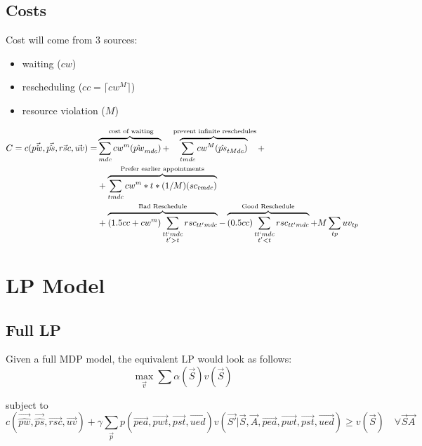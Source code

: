 \documentclass{article}
\begin{document}
\subsection{Costs}
Cost will come from 3 sources:  
\begin{itemize} 
	\item waiting ($cw$)
	\item rescheduling ($cc = \lceil cw^M \rceil$)
	\item resource violation ($M$)
\end{itemize}

\begin{equation}\begin{alignedat}{10}
	& C = c(\vec{\hat{pw}}, \vec{\hat{ps}}, \vec{rsc}, \vec{uv}) = 
		&& 
			\overbrace{ \sum_{mdc} cw^{m} (\hat{pw}_{mdc}) }^\text{
				cost of waiting}  + 
			\overbrace{ \sum_{tmdc} cw^{M} (\hat{ps}_{tMdc})}^\text{
				prevent infinite reschedules} + \\
	&	&&	+
				\overbrace{
					\sum_{tmdc} cw^{m} * t * (1/M)  (sc_{tmdc})
				}^\text{Prefer earlier appointments} \\ 
	&	&&  +
			\overbrace{
				(1.5cc+cw^{m}) \sum_{
				\substack{tt`mdc \\ t' > t}} 
				rsc_{tt'mdc}}^\text{Bad Reschedule} - 
			\overbrace{ 
				(0.5cc) \sum_{
				\substack{tt`mdc \\ t' < t}}
				rsc_{tt'mdc}}^\text{Good Reschedule} + 
			M \sum_{tp} uv_{tp}
\end{alignedat}\end{equation}

\section{LP Model}

\subsection{Full LP} 
Given a full MDP model, the equivalent LP would look as follows:
\begin{equation}
	\max_{\vec{v}} \sum \alpha (\vec{S}) v(\vec{S}) 
\end{equation}

subject to
\begin{equation}
	c(\vec{\hat{pw}}, \vec{\hat{ps}}, \vec{rsc}, \vec{uv}) + \gamma \sum_{\vec{p}} p(\vec{pea}, \vec{pwt}, \vec{pst}, \vec{ued}) v( \vec{S'} | \vec{S}, \vec{A}, \vec{pea}, \vec{pwt}, \vec{pst}, \vec{ued}) \ge v(\vec{S}) \quad \forall \vec{S} \vec{A}
\end{equation}
\end{document}
